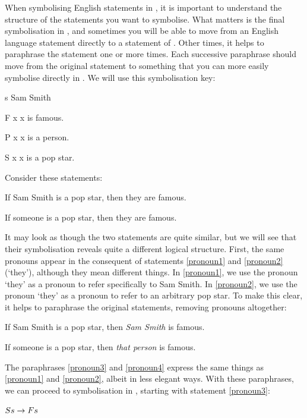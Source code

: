 \documentclass[PHIL101-Textbook.tex]{subfiles}
\begin{document}
When symbolising English statements in \pl, it is important to understand the structure of the statements you want to symbolise. What matters is the final symbolisation in \pl, and sometimes you will be able to move from an English language statement directly to a statement of \pl. Other times, it helps to paraphrase the statement one or more times. Each successive paraphrase should move from the original statement to something that you can more easily symbolise directly in \pl. We will use this symbolisation key:
\begin{ekey}
\item[s] Sam Smith
\item[\atom F x ] x is famous.
\item[\atom P x ] x is a person.
  \item[\atom S x ] x is a pop star. 
\end{ekey}
\noindent Consider these statements:
\begin{earg}
\item[\ex{pronoun1}] If Sam Smith is a pop star, then they are famous. 
\item[\ex{pronoun2}] If someone is a pop star, then they are famous.
\end{earg}
\noindent It may look as though the two statements are quite similar, but we will see that their symbolisation reveals quite a different logical structure. First, the same pronouns appear in the consequent of statements \ref{pronoun1} and \ref{pronoun2} (`they'), although they mean different things. In \ref{pronoun1}, we use the pronoun `they' as a pronoun to refer specifically to Sam Smith.
In \ref{pronoun2}, we use the pronoun `they' as a pronoun to refer to an arbitrary pop star. To make this clear, it helps to paraphrase the original statements, removing pronouns altogether:

\begin{earg}
\item[\ex{pronoun3}] If Sam Smith is a pop star, then \emph{Sam Smith} is famous. 
\item[\ex{pronoun4}] If someone is a pop star, then \emph{that person} is famous.
\end{earg}

\noindent The paraphrases \ref{pronoun3} and \ref{pronoun4} express the same things as \ref{pronoun1} and \ref{pronoun2}, albeit in less elegant ways. With these paraphrases, we can proceed to symbolisation in \pl, starting with statement \ref{pronoun3}:

\begin{earg}
\item[\ex{pronoun5}] $\mathord{S}{s} \rightarrow \mathord{F}{s}$
\end{earg}
\end{document}
